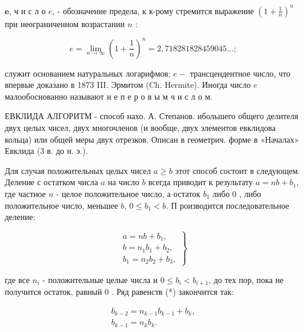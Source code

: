 \documentclass[10pt]{article}
\begin{document}
$\boldsymbol{e}$, ч и с л о $e$, - обозначение предела, к к-рому стремится выражение $\left(1+\frac{1}{n}\right)^{n}$ при неограниченном возрастании $n$ :



\[

e=\lim _{n \rightarrow \infty}\left(1+\frac{1}{n}\right)^{n}=2,718281828459045 \ldots ;

\]



служит основанием натуральных логарифмов; $e-$ трансцендентное число, что впервые доказано в 1873 III. Эрмитом (Ch. Hermite). Иногда число $e$ малообоснованно называют н е п е р о в ы м ч и с л о м.



ЕВКЛИДА АЛГОРИТМ - способ нахо. А. Степанов. ибольшего общего делителя двух целых чисел, двух многочленов (и вообще, двух элементов евклидова кольца) или общей меры двух отрезков. Описан в геометрич. форме в «Началах» Евклида (3 в. до н. э.).



Для случая положительных целых чисел $a \geqslant b$ этот способ состоит в следующем. Деление с остатком числа $a$ на число $b$ всегда приводит к результату $a=n b+b_{1}$, где частное $n$ - целое положительное число, а остаток $b_{1}$ либо 0 , либо положительное число, меньшее $b$, $0 \leqslant b_{1}<b$. П роизводится последовательное деление:



\[

\left.\begin{array}{c}

a=n b+b_{1}, \\

b=n_{1} b_{1}+b_{2}, \\

b_{1}=n_{2} b_{2}+b_{3},

\end{array}\right\}

\]



где все $n_{i}$ - положительные целые числа и $0 \leqslant b_{i}<b_{i+1}$, до тех пор, пока не получится остаток, равный 0 . Ряд равенств (*) закончится так:



\[

\begin{gathered}

b_{k-2}=n_{k-1} b_{k-1}+b_{k}, \\

b_{k-1}=n_{k} b_{k} .

\end{gathered}

\]
\end{document}
